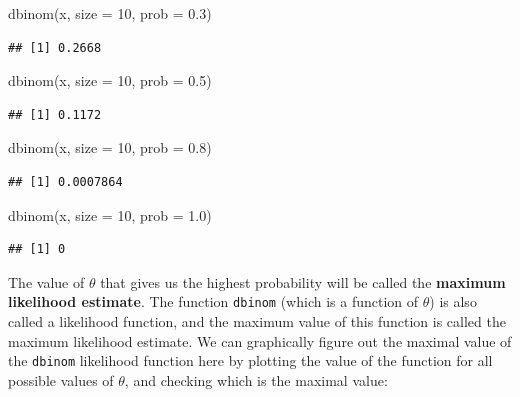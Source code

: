 \documentclass[
  12pt,
]{krantz}
\newenvironment{Shaded}{\begin{snugshade}}{\end{snugshade}}
\newcommand{\AttributeTok}[1]{\textcolor[rgb]{0.77,0.63,0.00}{#1}}
\newcommand{\DecValTok}[1]{\textcolor[rgb]{0.00,0.00,0.81}{#1}}
\newcommand{\FloatTok}[1]{\textcolor[rgb]{0.00,0.00,0.81}{#1}}
\newcommand{\FunctionTok}[1]{\textcolor[rgb]{0.00,0.00,0.00}{#1}}
\newcommand{\NormalTok}[1]{#1}
\theoremstyle{definition}
\theoremstyle{definition}
\theoremstyle{definition}
\theoremstyle{definition}
\theoremstyle{remark}
\begin{document}
\begin{Shaded}
\begin{Highlighting}[]
\FunctionTok{dbinom}\NormalTok{(x, }\AttributeTok{size =} \DecValTok{10}\NormalTok{, }\AttributeTok{prob =} \FloatTok{0.3}\NormalTok{)}
\end{Highlighting}
\end{Shaded}

\begin{verbatim}
## [1] 0.2668
\end{verbatim}

\begin{Shaded}
\begin{Highlighting}[]
\FunctionTok{dbinom}\NormalTok{(x, }\AttributeTok{size =} \DecValTok{10}\NormalTok{, }\AttributeTok{prob =} \FloatTok{0.5}\NormalTok{)}
\end{Highlighting}
\end{Shaded}

\begin{verbatim}
## [1] 0.1172
\end{verbatim}

\begin{Shaded}
\begin{Highlighting}[]
\FunctionTok{dbinom}\NormalTok{(x, }\AttributeTok{size =} \DecValTok{10}\NormalTok{, }\AttributeTok{prob =} \FloatTok{0.8}\NormalTok{)}
\end{Highlighting}
\end{Shaded}

\begin{verbatim}
## [1] 0.0007864
\end{verbatim}

\begin{Shaded}
\begin{Highlighting}[]
\FunctionTok{dbinom}\NormalTok{(x, }\AttributeTok{size =} \DecValTok{10}\NormalTok{, }\AttributeTok{prob =} \FloatTok{1.0}\NormalTok{)}
\end{Highlighting}
\end{Shaded}

\begin{verbatim}
## [1] 0
\end{verbatim}

The value of \(\theta\) that gives us the highest probability will be called the \textbf{maximum likelihood estimate}. The function \texttt{dbinom} (which is a function of \(\theta\)) is also called a likelihood function, and the maximum value of this function is called the maximum likelihood estimate. We can graphically figure out the maximal value of the \texttt{dbinom} likelihood function here by plotting the value of the function for all possible values of \(\theta\), and checking which is the maximal value:
\end{document}
